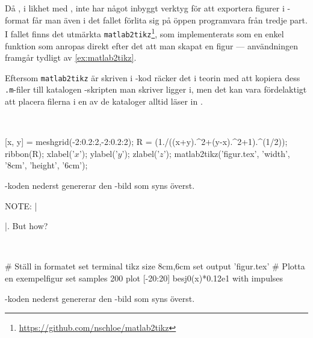 \documentclass[lang=sv,ptsize=10pt,font=none,nomath,titles=bf,../../a4.tex]{subfiles}
\begin{document}
\label{sec:matlab2tikz}
Då \MATLAB, i likhet med \Rlogo, inte har något inbyggt verktyg för att
exportera figurer i \PGFTikZ-format får man även i det fallet förlita sig
på öppen programvara från tredje part. I fallet \MATLAB finns det utmärkta
\texttt{matlab2tikz}\footnote{\url{https://github.com/nschloe/matlab2tikz}},
som implementerats som en enkel funktion som anropas direkt efter det
att man skapat en figur — användningen framgår tydligt av \cref{ex:matlab2tikz}.

Eftersom \texttt{matlab2tikz} är skriven i \MATLAB-kod räcker det i
teorin med att kopiera dess \texttt{.m}-filer till katalogen
\MATLAB-skripten man skriver ligger i, men det kan vara fördelaktigt att
placera filerna i en av de kataloger \MATLAB alltid läser in
\parencite{MATLAB13:path}.

\begin{kod}[tbp]
	\centering
	\begin{minipage}{\textwidth}
		\centering
		
	\end{minipage}
	\\[2ex]
	\begin{minipage}{\textwidth}
		\begin{matlabcode}
[x, y] = meshgrid(-2:0.2:2,-2:0.2:2);
R = (1./((x+y).^2+(y-x).^2+1).^(1/2));
ribbon(R);
xlabel('$x$'); ylabel('$y$'); zlabel('$z$');
matlab2tikz('figur.tex', 'width', '8cm', 'height', '6cm');
		\end{matlabcode}
	\end{minipage}
	\caption{\MATLAB-koden nederst genererar den \PGFTikZ-bild som
	syns överst.}
	\label{ex:matlab2tikz}
\end{kod}


NOTE: \latex|\usepackage{gnuplot-lua-tikz}|. But how?

\begin{kod}[tbp]
	\centering
	\begin{minipage}{\textwidth}
		\centering
%		
	\end{minipage}
	\\[2ex]
	\begin{minipage}{\textwidth}
		\begin{matlabcode}
# Ställ in formatet
set terminal tikz size 8cm,6cm
set output 'figur.tex'
# Plotta en exempelfigur
set samples 200
plot [-20:20] besj0(x)*0.12e1 with impulses
		\end{matlabcode}
	\end{minipage}
	\caption{\gnuplot-koden nederst genererar den \PGFTikZ-bild som
	syns överst.}
	\label{ex:gnuplot:tikz}
\end{kod}
\end{document}
